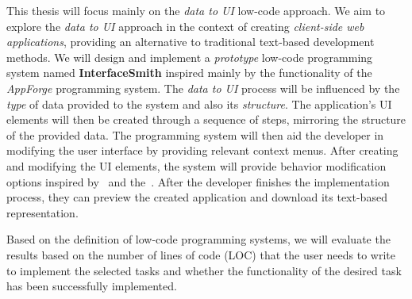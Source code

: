 This thesis will focus mainly on the \emph{data to UI} low-code approach.
We aim to explore the \emph{data to UI} approach in the context of creating \emph{client-side web applications}, providing an alternative to traditional text-based development methods.
We will design and implement a \emph{prototype} low-code programming system named \textbf{InterfaceSmith} inspired mainly by the functionality of the \emph{AppForge} programming system.
The \emph{data to UI} process will be influenced by the \emph{type} of data provided to the system and also its \emph{structure}.
The application's UI elements will then be created through a sequence of steps, mirroring the structure of the provided data.
The programming system will then aid the developer in modifying the user interface by providing relevant context menus.
After creating and modifying the UI elements, the system will provide behavior modification options inspired by~\citet{elm} and the~\citet{elm-arch}.
After the developer finishes the implementation process, they can preview the created application and download its text-based representation.

Based on the definition of low-code programming systems, we will evaluate the results based on the number of lines of code (LOC) that the user needs to write to implement the selected tasks and whether the functionality of the desired task has been successfully implemented.


